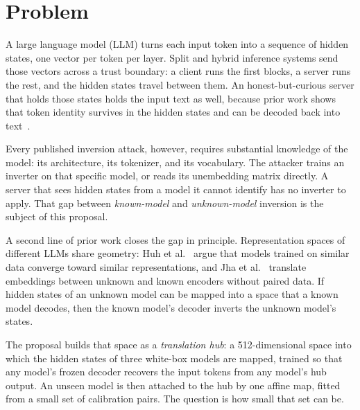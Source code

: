 \section{Problem}\label{sec:intro:problem}

A large language model (LLM) turns each input token into a sequence of hidden states, one vector per token per layer. Split and hybrid inference systems send those vectors across a trust boundary: a client runs the first blocks, a server runs the rest, and the hidden states travel between them. An honest-but-curious server that holds those states holds the input text as well, because prior work shows that token identity survives in the hidden states and can be decoded back into text~.

Every published inversion attack, however, requires substantial knowledge of the model: its architecture, its tokenizer, and its vocabulary. The attacker trains an inverter on that specific model, or reads its unembedding matrix directly. A server that sees hidden states from a model it cannot identify has no inverter to apply. That gap between \emph{known-model} and \emph{unknown-model} inversion is the subject of this proposal.

A second line of prior work closes the gap in principle. Representation spaces of different LLMs share geometry: Huh et al.~ argue that models trained on similar data converge toward similar representations, and Jha et al.~ translate embeddings between unknown and known encoders without paired data. If hidden states of an unknown model can be mapped into a space that a known model decodes, then the known model's decoder inverts the unknown model's states.

The proposal builds that space as a \emph{translation hub}: a 512-dimensional space into which the hidden states of three white-box models are mapped, trained so that any model's frozen decoder recovers the input tokens from any model's hub output. An unseen model is then attached to the hub by one affine map, fitted from a small set of calibration pairs. The question is how small that set can be.
